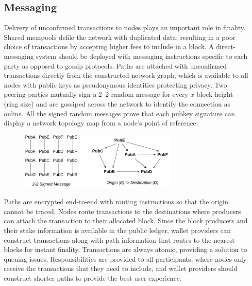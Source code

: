 \documentclass[a4paper,	10pt]{extarticle}
\begin{document}
\subsection{Messaging}
Delivery of unconfirmed transactions to nodes plays an important role in finality. Shared mempools defile the network with duplicated data, resulting in a poor choice of transactions by accepting higher fees to include in a block. A direct-messaging system should be deployed with messaging instructions specific to each party as opposed to gossip protocols. Paths are attached with unconfirmed transactions directly from the constructed network graph, which is available to all nodes with public keys as pseudonymous identities protecting privacy. Two peering parties mutually sign a 2–2 random message for every $x$ block height (ring size) and are gossiped across the network to identify the connection as online. All the signed random messages prove that each pubkey signature can display a network topology map from a node's point of reference.
\begin{figure}[H]
\begin{center}
\includegraphics[width=8cm]{topology}
\end{center}
\end{figure}
Paths are encrypted end-to-end with routing \cite{poon2016bitcoin} instructions so that the origin cannot be traced. Nodes route transactions to the destinations where producers can attach the transaction to their allocated block. Since the block producers and their stake information is available in the public ledger, wallet providers can construct transactions along with path information that routes to the nearest blocks for instant finality. Transactions are always atomic, providing a solution to queuing issues. Responsibilities are provided to all participants, where nodes only receive the transactions that they need to include, and wallet providers should construct shorter paths to provide the best user experience.
\end{document}
